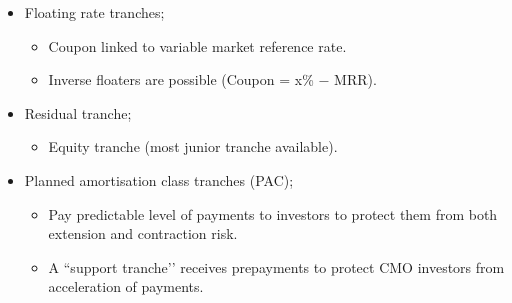 \documentclass[../notes_compiled.tex]{subfiles}
\begin{document}
\begin{itemize}
\begin{itemize}
\begin{itemize}
\end{itemize}
\item Floating rate tranches;
\begin{itemize}
\item Coupon linked to variable market reference rate.
\item Inverse floaters are possible (Coupon = x\% $-$ MRR).
\end{itemize}
\item Residual tranche;
\begin{itemize}
\item Equity tranche (most junior tranche available).
\end{itemize}
\item Planned amortisation class tranches (PAC);
\begin{itemize}
\item Pay predictable level of payments to investors to protect them from both extension and contraction risk.
\item A ``support tranche’’ receives prepayments to protect CMO investors from acceleration of payments.
\end{itemize}
\end{itemize}
\end{itemize}
\end{document}
